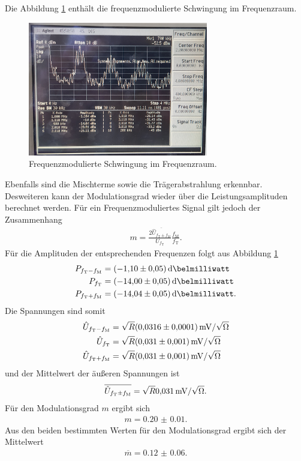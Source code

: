 Die Abbildung \ref{fig:frequenz_freq} enthält die frequenzmodulierte Schwingung
im Frequenzraum.
\begin{figure}
  \centering
  \includegraphics[width=0.7\textwidth]{spec/frequenzmodulation_bereich_fresh_cool.jpg}
  \caption{Frequenzmodulierte
Schwingung im Frequenzraum.}
\label{fig:frequenz_freq}
\end{figure}
Ebenfalls sind die Mischterme sowie die Trägerabstrahlung erkennbar.
Desweiteren kann der Modulationsgrad wieder
über die Leistungsamplituden berechnet werden.
Für ein Frequenzmoduliertes Signal gilt jedoch der Zusammenhang
\begin{align}
m=\frac{2\overline{\hat{U}_{f_{\text{T}}\pm f_{\text{M}}}}}{U_{f_{\text{T}}}} \frac{f_{\text{M}}}{f_{\text{T}}}. \label{eqn:m_leistung_f}
\end{align}
Für die Amplituden der entsprechenden Frequenzen
folgt aus Abbildung \ref{fig:frequenz_freq}
\begin{align}
P_{f_{\text{T}}-f_{\text{M}}}&=\SI{-1.10(5)}{\deci\belmilliwatt}\\
P_{f_{\text{T}}}&=\SI{-14.00(5)}{\deci\belmilliwatt}\\
P_{f_{\text{T}}+f_{\text{M}}}&=\SI{-14.04(5)}{\deci\belmilliwatt}.
\end{align}
Die Spannungen sind somit
\begin{align}
   \hat{U}_{f_{\text{T}}-f_{\text{M}}}&=\sqrt{R}\SI{0.0316(1)}{\milli\volt\per\sqrt{\ohm}}\\
  \hat{U}_{f_{\text{T}}}&=\sqrt{R}\SI{0.031(1)}{\milli\volt\per\sqrt{\ohm}}\\
  \hat{U}_{f_{\text{T}}+f_{\text{M}}}&=\sqrt{R}\SI{0.031(1)}{\milli\volt\per\sqrt{\ohm}}
\end{align}
und der Mittelwert der äußeren Spannungen ist
\begin{align}
  \overline{\hat{U}_{f_{\text{T}}\pm f_{\text{M}}}} = \sqrt{R}\SI{0.031(0)}{\milli\volt\per\sqrt{\ohm}}.
\end{align}
Für
den Modulationsgrad $m$ ergibt sich
\begin{align}
m=\num{0.20(1)}.
\end{align}
Aus den beiden bestimmten Werten für den Modulationsgrad
ergibt sich der Mittelwert
\begin{align}
\overline{m}=\num{0.12(6)}.
\end{align}




